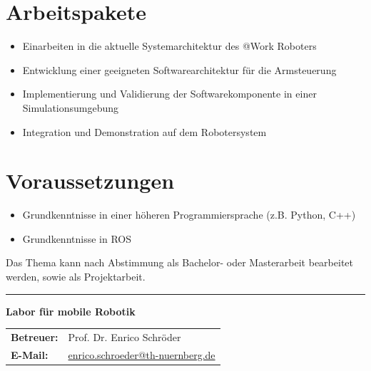 \documentclass{ohm_project_description}
\begin{document}
\section*{Arbeitspakete}
\begin{itemize}[leftmargin=0.5cm]
    \setlength\itemsep{.1em}
    \item Einarbeiten in die aktuelle Systemarchitektur des @Work Roboters
    \item Entwicklung einer geeigneten Softwarearchitektur für die Armsteuerung
    \item Implementierung und Validierung der Softwarekomponente in einer Simulationsumgebung 
    \item Integration und Demonstration auf dem Robotersystem 
\end{itemize}

\section*{Voraussetzungen}
\begin{itemize}[leftmargin=0.5cm]
    \setlength\itemsep{.1em}
    \item Grundkenntnisse in einer höheren Programmiersprache (z.B. Python, C++)
    \item Grundkenntnisse in ROS
\end{itemize}

\vspace{0.5cm}
Das Thema kann nach Abstimmung als Bachelor- oder Masterarbeit bearbeitet werden, sowie als Projektarbeit. 


\vfill
\textcolor{ohm_red}{\rule{\linewidth}{0.4mm}}
\textbf{\textcolor{ohm_red}{Labor für mobile Robotik}} \\
\begin{tabular}{@{}ll}
\textbf{Betreuer:} & Prof. Dr. Enrico Schröder \\
\textbf{E-Mail:}   & \href{mailto:enrico.schroeder@th-nuernberg.de}{enrico.schroeder@th-nuernberg.de} \\
\end{tabular}
\end{document}
